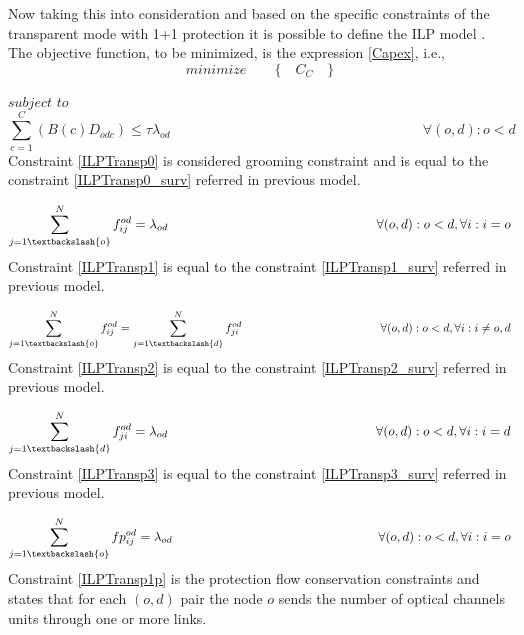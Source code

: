 Now taking this into consideration and based on the specific constraints of the transparent mode with 1+1 protection it is possible to define the ILP model \cite{Balakrishnan09}.\\
\newpage
The objective function, to be minimized, is the expression \ref{Capex}, i.e.,
\begin{equation*}
  minimize \qquad \Big\{ \quad C_C \quad \Big\}
\end{equation*}

$subject$ $to$
\begin{equation}
\sum_{c=1}^{C} (B\left(c\right) D_{odc}) \leq \tau \lambda_{od} \qquad \qquad \qquad \qquad \qquad \qquad \qquad \qquad \qquad
\forall(o,d) : o < d
\label{ILPTransp0}
\end{equation}
\noindent
Constraint \ref{ILPTransp0} is considered grooming constraint and is equal to the constraint \ref{ILPTransp0_surv} referred in previous model.

\begin{equation}
\sum_{j=1\textbackslash \{o\}}^{N} f_{ij}^{od} = \lambda_{od}  \qquad \qquad \qquad \qquad \qquad \qquad \qquad \qquad
\forall(o,d) : o < d, \forall i: i = o
\label{ILPTransp1}
\end{equation}
\noindent
Constraint \ref{ILPTransp1} is equal to the constraint \ref{ILPTransp1_surv} referred in previous model.

\begin{equation}
\sum_{j=1\textbackslash \{o\}}^{N} f_{ij}^{od} = \sum_{j=1\textbackslash \{d\}}^{N} f_{ji}^{od} \qquad \qquad \qquad \qquad \qquad \qquad
\forall(o,d) : o < d, \forall i: i \neq o,d
\label{ILPTransp2}
\end{equation}
\noindent
Constraint \ref{ILPTransp2} is equal to the constraint \ref{ILPTransp2_surv} referred in previous model.

\begin{equation}
\sum_{j=1\textbackslash \{d\}}^{N} f_{ji}^{od} = \lambda_{od}  \qquad \qquad \qquad \qquad \qquad \qquad \qquad \qquad
\forall(o,d) : o < d, \forall i: i = d
\label{ILPTransp3}
\end{equation}
\noindent
Constraint \ref{ILPTransp3} is equal to the constraint \ref{ILPTransp3_surv} referred in previous model.

\begin{equation}
\sum_{j=1\textbackslash \{o\}}^{N} fp_{ij}^{od} = \lambda_{od} \qquad \qquad \qquad \qquad \qquad \qquad \qquad \qquad
\forall(o,d) : o < d, \forall i: i = o
\label{ILPTransp1p}
\end{equation}
\noindent
Constraint \ref{ILPTransp1p} is the protection flow conservation constraints and states that for each $(o,d)$ pair the node $o$ sends the number of optical channels units through one or more links.

